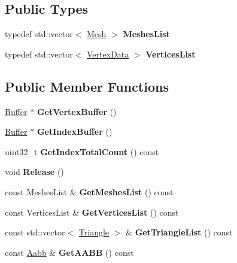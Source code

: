 \subsection*{Public Types}
\begin{DoxyCompactItemize}
\item 
\mbox{\label{classModel_a1383a9f3b27fa6afaeec834f98787469}} 
typedef std\+::vector$<$ \hyperlink{classMesh}{Mesh} $>$ {\bfseries Meshes\+List}
\item 
\mbox{\label{classModel_acd01edc2653c0488d1cdb852b3b5312f}} 
typedef std\+::vector$<$ \hyperlink{structVertexData}{Vertex\+Data} $>$ {\bfseries Vertices\+List}
\end{DoxyCompactItemize}
\subsection*{Public Member Functions}
\begin{DoxyCompactItemize}
\item 
\mbox{\label{classModel_a48c5723ee018e1fb2875d510b32372e4}} 
\hyperlink{classBuffer}{Buffer} $\ast$ {\bfseries Get\+Vertex\+Buffer} ()
\item 
\mbox{\label{classModel_a22b66b76c6f8e17f9239d500ff03d09f}} 
\hyperlink{classBuffer}{Buffer} $\ast$ {\bfseries Get\+Index\+Buffer} ()
\item 
\mbox{\label{classModel_a6a2d8f9eddca5db21295de9c90b87421}} 
uint32\+\_\+t {\bfseries Get\+Index\+Total\+Count} () const
\item 
\mbox{\label{classModel_a2fc308f7267e7034ff3cf07f3e62c09d}} 
void {\bfseries Release} ()
\item 
\mbox{\label{classModel_a759f50783d758801f2893d8991acb349}} 
const Meshes\+List \& {\bfseries Get\+Meshes\+List} () const
\item 
\mbox{\label{classModel_a188605e846853ac0020678922e898015}} 
const Vertices\+List \& {\bfseries Get\+Vertices\+List} () const
\item 
\mbox{\label{classModel_a4bceb2cedfa99f87ae84763d27a00986}} 
const std\+::vector$<$ \hyperlink{structModel_1_1Triangle}{Triangle} $>$ \& {\bfseries Get\+Triangle\+List} () const
\item 
\mbox{\label{classModel_a3dd43b49bf52682994f40fa7303bcf20}} 
const \hyperlink{classAabb}{Aabb} \& {\bfseries Get\+A\+A\+BB} () const
\end{DoxyCompactItemize}
